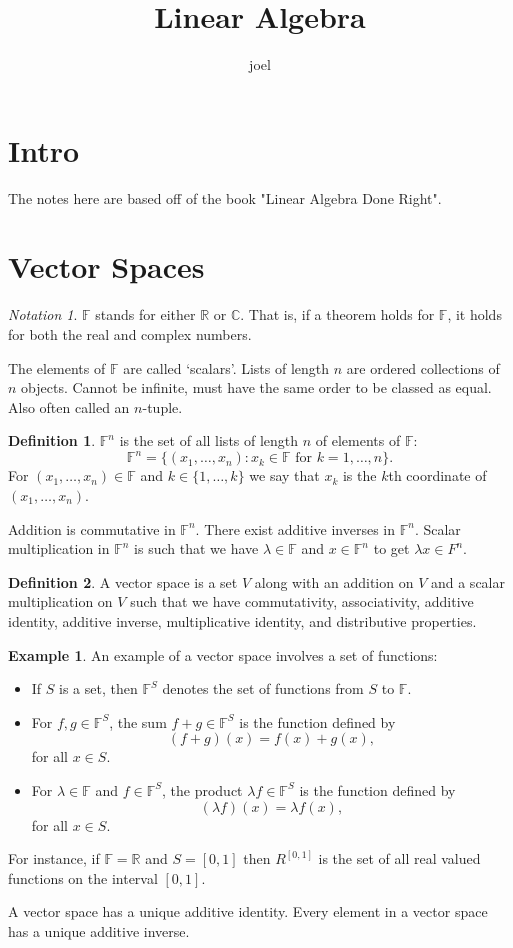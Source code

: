\documentclass[10pt]{article}
\title{Linear Algebra}
\author{joel}
\date{}
\theoremstyle{definition}
\newtheorem{definition}{Definition}
\newtheorem{example}{Example}
\theoremstyle{remark}
\newtheorem{notation}{Notation}
\newcommand{\R}{\mathbb{R}}
\newcommand{\C}{\mathbb{C}}
\newcommand{\F}{\mathbb{F}}
\begin{document}
\maketitle

\section*{Intro}

The notes here are based off of the book "Linear Algebra Done Right". 

\section{Vector Spaces}

\begin{notation}
    $\F$ stands for either $\R$ or $\C$. That is, if a theorem holds for $\F$, it holds
    for both the real and complex numbers. 
\end{notation}

The elements of $\F$ are called `scalars'. Lists of length $n$ are ordered
collections of $n$ objects. Cannot be infinite, must have the same order to be
classed as equal. Also often called an $n$-tuple. 

\begin{definition}
    $\F^n$ is the set of all lists of length $n$ of elements of $\F$: 
    \[ \F^n = \{ (x_1, \ldots, x_n) : x_k \in \F \text{ for } k = 1, \ldots, n\}. \]
    For $(x_1, \ldots, x_n) \in \F$ and $k \in \{1, \ldots, k\}$ we say that
    $x_k$ is the $k$th coordinate of $(x_1, \ldots, x_n)$.
\end{definition}

Addition is commutative in $\F^n$. 
There exist additive inverses in $\F^n$.
Scalar multiplication in $\F^n$ is such that we have $\lambda \in \F$ and $x \in \F^n$
to get $\lambda x \in F^n$.

\begin{definition}
    A vector space is a set $V$ along with an addition on $V$ and a scalar
    multiplication on $V$ such that we have commutativity, associativity, additive identity, 
    additive inverse, multiplicative identity, and distributive properties. 
\end{definition}


\begin{example}
    An example of a vector space involves a set of functions: 
    \begin{itemize}
        \item If $S$ is a set, then $\F^S$ denotes the set of functions from $S$ to $\F$. 
        \item For $f, g \in \F^S$, the sum $f + g \in \F^S$ is the function defined by 
            \[ (f +g)(x) = f(x) + g(x), \] for all $x \in S$. 
        \item For $\lambda \in \F$ and $f \in \F^S$, the product $\lambda f \in \F^S$ is the function defined by 
            \[ (\lambda f)(x) = \lambda f ( x), \] for all $x \in S$. 
    \end{itemize}
    For instance, if $\F = \R$ and $S = [0, 1]$ then $R^{[0,1]}$ is the set of
    all real valued functions on the interval $[0, 1]$.
\end{example}

A vector space has a unique additive identity. 
Every element in a vector space has a unique additive inverse. 
\end{document}
